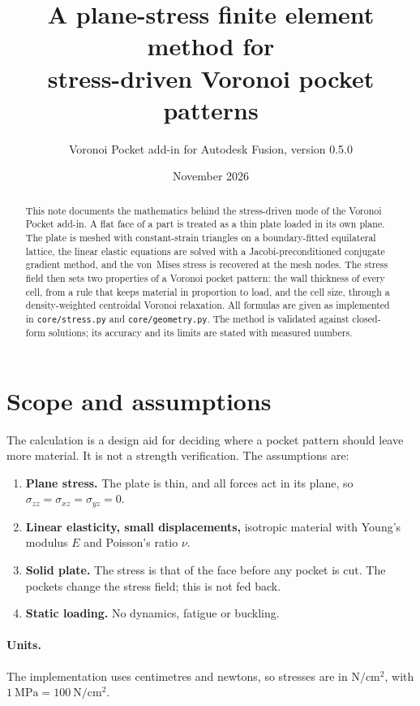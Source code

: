 \documentclass[11pt,a4paper]{article}
\title{A plane-stress finite element method for\\
       stress-driven Voronoi pocket patterns}
\author{Voronoi Pocket add-in for Autodesk Fusion, version 0.5.0}
\date{November 2026}
\begin{document}
\maketitle

\begin{abstract}
\noindent
This note documents the mathematics behind the stress-driven mode of the
Voronoi Pocket add-in. A flat face of a part is treated as a thin plate
loaded in its own plane. The plate is meshed with constant-strain triangles
on a boundary-fitted equilateral lattice, the linear elastic equations are
solved with a Jacobi-preconditioned conjugate gradient method, and the
von~Mises stress is recovered at the mesh nodes. The stress field then sets
two properties of a Voronoi pocket pattern: the wall thickness of every
cell, from a rule that keeps material in proportion to load, and the cell
size, through a density-weighted centroidal Voronoi relaxation. All formulas
are given as implemented in \texttt{core/stress.py} and
\texttt{core/geometry.py}. The method is validated against closed-form
solutions; its accuracy and its limits are stated with measured numbers.
\end{abstract}

\section{Scope and assumptions}

The calculation is a design aid for deciding where a pocket pattern should
leave more material. It is not a strength verification. The assumptions are:

\begin{enumerate}
  \item \textbf{Plane stress.} The plate is thin, and all forces act in its
        plane, so $\sigma_{zz}=\sigma_{xz}=\sigma_{yz}=0$.
  \item \textbf{Linear elasticity, small displacements,} isotropic material
        with Young's modulus $E$ and Poisson's ratio $\nu$.
  \item \textbf{Solid plate.} The stress is that of the face before any
        pocket is cut. The pockets change the stress field; this is not fed
        back.
  \item \textbf{Static loading.} No dynamics, fatigue or buckling.
\end{enumerate}

\paragraph{Units.} The implementation uses centimetres and newtons, so
stresses are in $\mathrm{N/cm^2}$, with
$1~\mathrm{MPa} = 100~\mathrm{N/cm^2}$.
\end{document}
